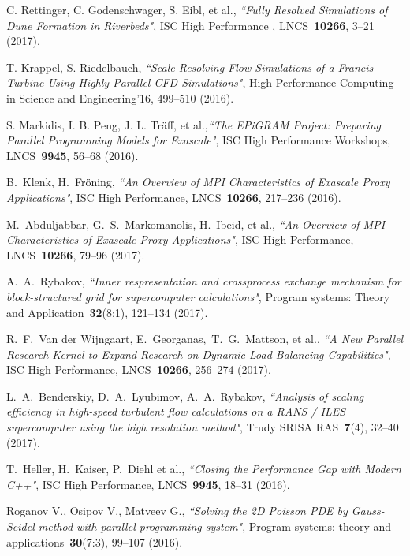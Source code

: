 \documentclass[
11pt,%
tightenlines,%
twoside,%
onecolumn,%
nofloats,%
nobibnotes,%
nofootinbib,%
superscriptaddress,%
noshowpacs,%
centertags]%
{revtex4}
\begin{document}
\begin{thebibliography}{99}

C. Rettinger, C. Godenschwager, S. Eibl, et al., {\it ``Fully Resolved Simulations of Dune Formation in Riverbeds"}, ISC High Performance , LNCS~{\bf 10266}, 3--21 (2017).

T. Krappel, S. Riedelbauch, {\it ``Scale Resolving Flow Simulations of a Francis Turbine Using Highly Parallel CFD Simulations"}, High Performance Computing in Science and Engineering'16, 499--510 (2016).

S. Markidis, I. B. Peng, J. L. Tr\"aff, et al.,{\it ``The EPiGRAM Project: Preparing Parallel Programming Models for Exascale"}, ISC High Performance Workshops, LNCS~{\bf 9945}, 56--68  (2016).

B.~Klenk, H.~Fr\"oning, {\it ``An Overview of MPI Characteristics of Exascale Proxy Applications"}, ISC High Performance, LNCS~{\bf 10266}, 217--236  (2016).

M.~Abduljabbar, G.~S.~Markomanolis, H.~Ibeid, et al., {\it ``An Overview of MPI Characteristics of Exascale Proxy Applications"}, ISC High Performance, LNCS~{\bf 10266}, 79--96 (2017).

A.~A.~Rybakov, {\it ``Inner respresentation and crossprocess exchange mechanism for block-structured grid for supercomputer calculations"}, Program systems: Theory and Application~{\bf 32}(8:1), 121--134 (2017).

R.~F.~Van der Wijngaart, E.~Georganas,~T.~G.~Mattson, et al., {\it ``A New Parallel Research Kernel to Expand Research on Dynamic Load-Balancing Capabilities"}, ISC High Performance, LNCS~{\bf 10266}, 256--274 (2017).

L.~A.~Benderskiy, D.~A.~Lyubimov, A.~A.~Rybakov, {\it ``Analysis of scaling efficiency in high-speed turbulent flow calculations on a RANS / ILES supercomputer using the high resolution method"}, Trudy SRISA RAS~{\bf 7}(4), 32--40 (2017).

T.~Heller, H.~Kaiser, P.~Diehl et al., {\it ``Closing the Performance Gap with Modern C++"}, ISC High Performance, LNCS~{\bf 9945}, 18--31 (2016).

Roganov V., Osipov V., Matveev G., {\it ``Solving the 2D Poisson PDE by Gauss-Seidel method with parallel programming system"}, Program systems: theory and applications~{\bf 30}(7:3), 99--107 (2016).


\end{thebibliography}
\end{document}

